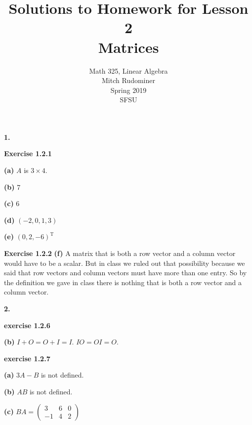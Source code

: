 \documentclass[oneside,12pt]{amsart}
\begin{document}
\title{Solutions to Homework for Lesson 2 \\ Matrices}
\author{Math 325, Linear Algebra \\ Mitch Rudominer \\ Spring 2019 \\ SFSU }
\date{}

\maketitle


\textbf{1.}

\smallskip

\textbf{Exercise 1.2.1}

\smallskip

\textbf{(a)} $A$ is $3\times 4$.

\smallskip

\textbf{(b)} 7

\smallskip

\textbf{(c)} 6

\smallskip

\textbf{(d)} $(-2, 0, 1, 3)$

\smallskip

\textbf{(e)} $(0,2, -6)^{\text{T}}$

\smallskip

\textbf{Exercise 1.2.2}
\smallskip
\textbf{(f)} A matrix that is both a row vector and a column vector would
have to be a scalar. But in class we ruled out that possibility because we said
that row vectors and column vectors must have more than one entry. So by the
definition we gave in class there is nothing that is both a row vector and
a column vector.

\smallskip

\textbf{2.}

\smallskip

\textbf{exercise 1.2.6}

\smallskip

\textbf{(b)} $I + O = O + I = I$. $I O = O I = O$.

\smallskip

\textbf{exercise 1.2.7}

\textbf{(a)} $3A - B$ is not defined.

\smallskip

\textbf{(b)} $AB$ is not defined.

\smallskip

\textbf{(c)} $BA =
\begin{pmatrix}
3 & 6 & 0 \\
-1 & 4 & 2
\end{pmatrix}
$
\end{document}
